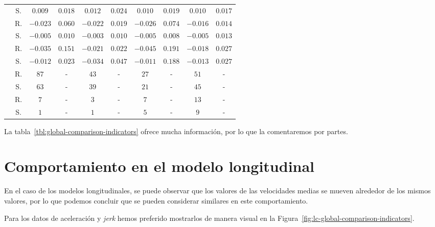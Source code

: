\begin{table*}
\begin{tabular}{cccccccccc}
		                                & S. & $0.009$  & $0.018$  & $0.012$  & $0.024$  & $0.010$  & $0.019$  & $0.010$  & $0.017$  \\
		\rowcolor{black!20} \cellcolor{white} \multirow{2}{*}{\textbf{$JIF$}} & R. & $-0.023$ & $0.060$  & $-0.022$ & $0.019$  & $-0.026$ & $0.074$  & $-0.016$ & $0.014$  \\
		                                & S. & $-0.005$ & $0.010$  & $-0.003$ & $0.010$  & $-0.005$ & $0.008$  & $-0.005$ & $0.013$  \\
		\rowcolor{black!20} \cellcolor{white} \multirow{2}{*}{\textbf{$JFF$}} & R. & $-0.035$ & $0.151$  & $-0.021$ & $0.022$  & $-0.045$ & $0.191$  & $-0.018$ & $0.027$  \\
		                                & S. & $-0.012$ & $0.023$  & $-0.034$ & $0.047$  & $-0.011$ & $0.188$  & $-0.013$ & $0.027$  \\
		\rowcolor{black!20} \cellcolor{white} \multirow{2}{*}{\textbf{$LC$}}  & R. & $87$     &    -     & $43$     &    -     & $27$     &    -     & $51$     &    -     \\
		                                & S. & $63$     &    -     & $39$     &    -     & $21$     &    -     & $45$     &    -     \\
		\rowcolor{black!20} \cellcolor{white} \multirow{2}{*}{\textbf{$RC$}}  & R. & $7$      &    -     & $3$      &    -     & $7$      &    -     & $13$     &    -     \\
                                        & S. & $1$      &    -     & $1$      &    -     & $5$      &    -     & $9$      &    -     \\
        \bottomrule
	\end{tabular}
\end{table*}

La tabla~\ref{tbl:global-comparison-indicators} ofrece mucha información, por lo que la comentaremos por partes.

\section{Comportamiento en el modelo longitudinal}

En el caso de los modelos longitudinales, se puede observar que los valores de las velocidades medias se mueven alrededor de los mismos valores, por lo que podemos concluir que se pueden considerar similares en este comportamiento.

Para los datos de aceleración y \textit{jerk} hemos preferido mostrarlos de manera visual en la Figura~\ref{fig:lc-global-comparison-indicators}.

